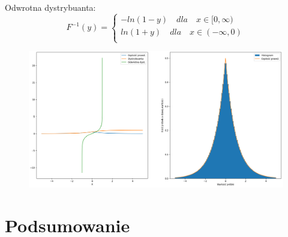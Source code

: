 \documentclass[12pt,a4paper]{article}
\begin{document}
  Odwrotna dystrybuanta:
    \begin{equation}
      F^{-1}(y) = \begin{cases}
            -ln(1 - y) \quad dla \quad x  \in [0, \infty)\\
            ln(1 + y) \quad dla \quad x  \in (-\infty, 0)\\
          \end{cases}   
    \end{equation}

  \begin{figure}[H]
    \centering
    \includegraphics[width=1\textwidth]{figures/Figure_19.png}
    \label{fig:19}
  \end{figure}


\section{Podsumowanie}
\end{document}
